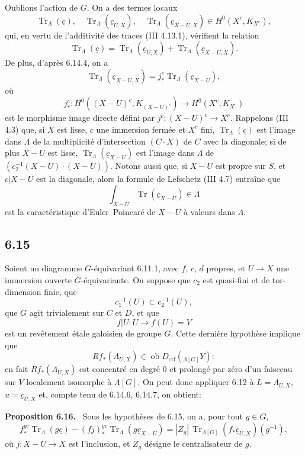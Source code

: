 \documentclass[11pt]{article}
\newenvironment{statement}[1]{\par\medskip\noindent\textbf{#1.}\ }{\par\medskip}
\providecommand{\Tr}{\operatorname{Tr}}
\providecommand{\Tr}{\operatorname{Tr}}
\providecommand{\Ob}{\operatorname{ob}}
\providecommand{\Tr}{\operatorname{Tr}}
\providecommand{\Ob}{\operatorname{ob}}
\providecommand{\Tr}{\operatorname{Tr}}
\providecommand{\Ob}{\operatorname{Ob}}
\providecommand{\Tr}{\operatorname{Tr}}
\providecommand{\Ob}{\operatorname{ob}}
\providecommand{\Ob}{\operatorname{Ob}}
\begin{document}
Oublions l'action de $G$. On a des termes locaux
\begin{equation}
\Tr_{\Lambda}(\underline c),\quad
\Tr_{\Lambda}(\underline c_{U,X}),\quad
\Tr_{\Lambda}(\underline c_{X-U,X})
\in H^0(X^c,K_{X^c}),
\tag{6.14.5}
\end{equation}
qui, en vertu de l'additivité des traces (III 4.13.1), vérifient la relation
\begin{equation}
\Tr_{\Lambda}(\underline c)
=
\Tr_{\Lambda}(\underline c_{U,X})
+
\Tr_{\Lambda}(\underline c_{X-U,X}).
\tag{6.14.6}
\end{equation}
De plus, d'après 6.14.4, on a
\begin{equation}
\Tr_{\Lambda}(\underline c_{X-U,X})
=
j_*^c\Tr_{\Lambda}(\underline c_{X-U}),
\tag{6.14.7}
\end{equation}
où
\[
j_*^c:H^0((X-U)^c,K_{(X-U)^c})\longrightarrow H^0(X^c,K_{X^c})
\]
est le morphisme image directe défini par $j^c:(X-U)^c\to X^c$. Rappelons (III 4.3) que, si $X$ est lisse, $c$ une immersion fermée et $X^c$ fini, $\Tr_{\Lambda}(\underline c)$ est l'image dans $\Lambda$ de la multiplicité d'intersection $(C\cdot X)$ de $C$ avec la diagonale; si de plus $X-U$ est lisse, $\Tr_{\Lambda}(\underline c_{X-U})$ est l'image dans $\Lambda$ de $(c_2^{-1}(X-U)\cdot(X-U))$. Notons aussi que, si $X-U$ est propre sur $S$, et $c|X-U$ est la diagonale, alors la formule de Lefschetz (III 4.7) entraîne que
\[
\int_{X-U}\Tr(\underline c_{X-U})\in\Lambda
\]
est la caractéristique d'Euler--Poincaré de $X-U$ à valeurs dans $\Lambda$.

\subsection*{6.15}
Soient un diagramme $G$-équivariant 6.11.1, avec $f$, $c$, $d$ propres, et $U\to X$ une immersion ouverte $G$-équivariante. On suppose que $c_2$ est quasi-fini et de tor-dimension finie, que
\[
c_1^{-1}(U)\subset c_2^{-1}(U),
\]
que $G$ agit trivialement sur $C$ et $D$, et que
\[
f|U:U\longrightarrow f(U)=V
\]
est un revêtement étale galoisien de groupe $G$. Cette dernière hypothèse implique que
\[
Rf_*(\Lambda_{U,X})\in\Ob D_{\mathrm{ctf}}({}_{\Lambda[G]}Y):
\]
en fait $Rf_*(\Lambda_{U,X})$ est concentré en degré $0$ et prolongé par zéro d'un faisceau sur $V$ localement isomorphe à $\Lambda[G]$. On peut donc appliquer 6.12 à $L=\Lambda_{U,X}$, $u=\underline c_{U,X}$ et, compte tenu de 6.14.6, 6.14.7, on obtient:

\begin{statement}{Proposition 6.16}
Sous les hypothèses de 6.15, on a, pour tout $g\in G$,
\begin{equation}
f_*^{gc}\Tr_{\Lambda}(g\underline c)
-(fj)_*^{gc}\Tr_{\Lambda}(g\underline c_{X-U})
=
|Z_g|\,\Tr_{\Lambda[G]}(f_*\underline c_{U,X})(g^{-1}),
\tag{6.16.1}
\end{equation}
où $j:X-U\to X$ est l'inclusion, et $Z_g$ désigne le centralisateur de $g$.
\end{statement}
\end{document}
